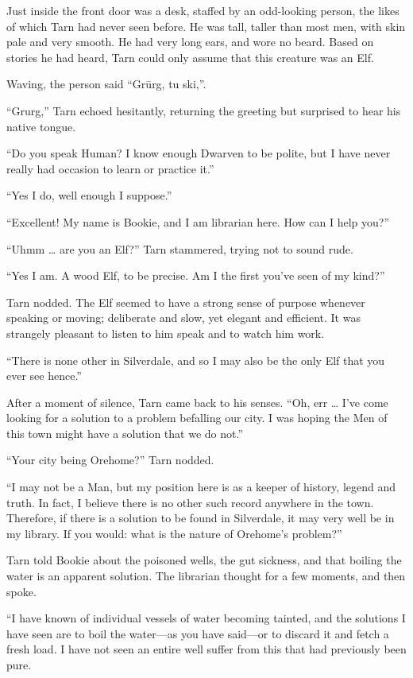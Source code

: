 Just inside the front door was a desk, staffed by an odd-looking person, the likes of which Tarn had never seen before.  He was tall, taller than most men, with skin pale and very smooth.  He had very long ears, and wore no beard.  Based on stories he had heard, Tarn could only assume that this creature was an Elf.

Waving, the person said ``Gr\=urg, tu ski,''.

``Grurg,'' Tarn echoed hesitantly, returning the greeting but surprised to hear his native tongue.

``Do you speak Human?  I know enough Dwarven to be polite, but I have never really had occasion to learn or practice it.''

``Yes I do, well enough I suppose.''

``Excellent!  My name is Bookie, and I am librarian here.  How can I help you?''

``Uhmm \ldots{} are you an Elf?'' Tarn stammered, trying not to sound rude.

``Yes I am.  A wood Elf, to be precise.  Am I the first you've seen of my kind?''

Tarn nodded.  The Elf seemed to have a strong sense of purpose whenever speaking or moving; deliberate and slow, yet elegant and efficient.  It was strangely pleasant to listen to him speak and to watch him work.

``There is none other in Silverdale, and so I may also be the only Elf that you ever see hence.''

After a moment of silence, Tarn came back to his senses.  ``Oh, err \ldots{} I've come looking for a solution to a problem befalling our city.  I was hoping the Men of this town might have a solution that we do not.''

``Your city being Orehome?''  Tarn nodded.

``I may not be a Man, but my position here is as a keeper of history, legend and truth.  In fact, I believe there is no other such record anywhere in the town.  Therefore, if there is a solution to be found in Silverdale, it may very well be in my library. If you would: what is the nature of Orehome's problem?''

Tarn told Bookie about the poisoned wells, the gut sickness, and that boiling the water is an apparent solution.  The librarian thought for a few moments, and then spoke.

``I have known of individual vessels of water becoming tainted, and the solutions I have seen are to boil the water---as you have said---or to discard it and fetch a fresh load.  I have not seen an entire well suffer from this that had previously been pure.

